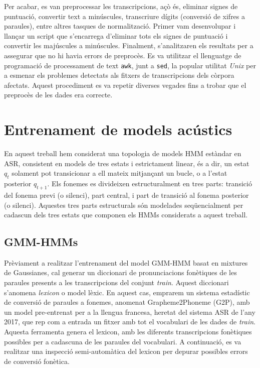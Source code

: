 Per acabar, es van preprocessar les transcripcions, açò és, eliminar signes de puntuació, convertir text a minúscules, transcriure dígits (conversió de xifres a paraules), entre altres tasques de normalització.
Primer vam desenvolupar i llançar un script que s'encarrega d'eliminar tots els signes de puntuació i convertir les majúscules a minúscules.
Finalment, s'analitzaren els resultats per a assegurar que no hi havia errors de preprocès. Es va utilitzar el llenguatge de programació de processament de text \texttt{awk}, junt a \texttt{sed}, la popular utilitat \textit{Unix} per a esmenar els problemes detectats als fitxers de transcripcions dels còrpora afectats. Aquest procediment es va repetir diverses vegades fins a trobar que el preprocès de les dades era correcte.



\section{Entrenament de models acústics}
\label{cap05_am}
En aquest treball hem considerat una topologia de models HMM estàndar en ASR, consistent en models de tres estats i estrictament linear, és a dir, un estat $q_t$ solament pot transicionar a ell mateix mitjançant un bucle, o a l'estat posterior $q_{t+1}$. Els fonemes es divideixen estructuralment en tres parts: transició del fonema previ (o silenci), part central, i part de transició al fonema posterior (o silenci). Aquestes tres parts estructurals són modelades seqüencialment per cadascun dels tres estats que componen els HMMs considerats a aquest treball.


\subsection{GMM-HMMs}
\label{cap05_am_gmm}
 

Prèviament a realitzar l'entrenament del model GMM-HMM basat en mixtures de Gaussianes, cal generar un diccionari de pronunciacions fonètiques de les paraules presents a les transcripcions del conjunt \textit{train}. Aquest diccionari s'anomena \textit{lexicon} o model lèxic.
En aquest cas, emprarem un sistema estadístic de conversió de paraules a fonemes, anomenat Grapheme2Phoneme (G2P), amb un model pre-entrenat per a la llengua francesa, heretat del sistema ASR de l'any 2017, que rep com a entrada un fitxer amb tot el vocabulari de les dades de \textit{train}. Aquesta ferramenta genera el lexicon, amb les diferents transcripcions fonètiques possibles per a cadascuna de les paraules del vocabulari.
A continuació, es va realitzar una inspecció semi-automàtica del lexicon per depurar possibles errors de conversió fonètica.


